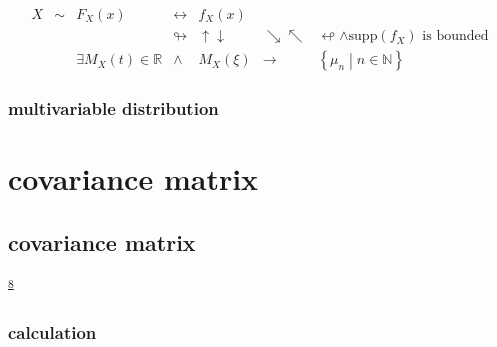\documentclass[
]{book}
\theoremstyle{definition}
\theoremstyle{definition}
\theoremstyle{definition}
\theoremstyle{definition}
\theoremstyle{remark}
\begin{document}
\[
\tag*{$\Box$}
\]

\[
\begin{array}{ccccccc}
X & \sim & F_{{\scriptscriptstyle X}}\left(x\right) & \leftrightarrow & f_{{\scriptscriptstyle X}}\left(x\right)\\
 &  &  & \looparrowright & \uparrow\downarrow & \searrow\nwarrow & \looparrowleft\wedge\mathrm{supp}\left(f_{{\scriptscriptstyle X}}\right)\text{ is bounded}\\
 &  & \exists M_{{\scriptscriptstyle X}}\left(t\right)\in\mathbb{R} & \wedge & M_{{\scriptscriptstyle X}}\left(\xi\right) & \rightarrow & \left\{ \mu_{{\scriptscriptstyle n}}\middle|n\in\mathbb{N}\right\} 
\end{array}
\]

\hypertarget{multivariable-distribution}{%
\subsection{multivariable distribution}\label{multivariable-distribution}}

\hypertarget{covariance-matrix}{%
\chapter{covariance matrix}\label{covariance-matrix}}

\hypertarget{covariance-matrix-1}{%
\section{covariance matrix}\label{covariance-matrix-1}}

\textsuperscript{\protect\hyperlink{ref-ccjou2014}{8}}

\hypertarget{calculation}{%
\subsection{calculation}\label{calculation}}
\end{document}
